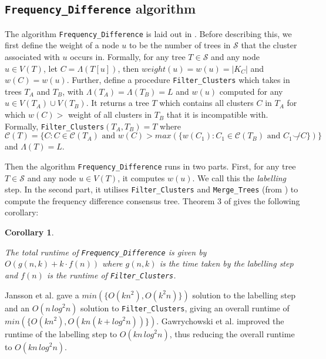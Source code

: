 \documentclass{article}
\newcommand{\compatible}{\smile}
\newcommand{\leafset}{\Lambda}
\newtheorem{freqdiffruntimecomponents}[incompatibility]{Corollary}
\begin{document}
    \subsection{\texttt{Frequency\_Difference} algorithm}
    The algorithm \texttt{Frequency\_Difference} is laid out in \cite{jansson2018algorithms}. Before describing this, we first define the weight of a node $u$ to be the number of trees in $\mathcal{S}$ that the cluster associated with $u$ occurs in. Formally, for any tree $T \in \mathcal{S}$ and any node $u \in V(T)$, let $C = \leafset(T[u])$, then $weight(u) = w(u) = |K_C|$ and $w(C) = w(u)$. Further, define a procedure \texttt{Filter\_Clusters} which takes in trees $T_A$ and $T_B$, with $\leafset(T_A) = \leafset(T_B) = L$ and $w(u)$ computed for any $u \in V(T_A) \cup V(T_B)$. It returns a tree $T$ which contains all clusters $C$ in $T_A$ for which $w(C) > $ weight of all clusters in $T_B$ that it is incompatible with. Formally, \texttt{Filter\_Clusters}$(T_A, T_B) = T$ where $\mathcal{C}(T) = \{C : C \in \mathcal{C}(T_A) \text{ and } w(C) > max(\{w(C_1) : C_1 \in \mathcal{C}(T_B) \text{ and } C_1 \not\compatible C\})\}$ and $\leafset(T) = L$.

    Then the algorithm \texttt{Frequency\_Difference} runs in two parts. First, for any tree $T \in \mathcal{S}$ and any node $u \in V(T)$, it computes $w(u)$. We call this the \textit{labelling} step. In the second part, it utilises \texttt{Filter\_Clusters} and \texttt{Merge\_Trees} (from \cite{jansson2016improved}) to compute the frequency difference consensus tree. Theorem 3 of \cite{jansson2018algorithms} gives the following corollary:

    \begin{freqdiffruntimecomponents}
        \label{cor:freqdiffruntimecomponents}

        The total runtime of \texttt{Frequency\_Difference} is given by $O(g(n, k) + k \cdot f(n))$ where $g(n, k)$ is the time taken by the labelling step and $f(n)$ is the runtime of \texttt{Filter\_Clusters}.
    \end{freqdiffruntimecomponents}

    Jansson et al. \cite{jansson2018algorithms} gave a $min(\{O(kn^2), O(k^2n)\})$ solution to the labelling step and an $O(n\,log^2n)$ solution to \texttt{Filter\_Clusters}, giving an overall runtime of $min(\{O(kn^2), O(kn(k + log^2n))\})$. Gawrychowski et al. \cite{gawrychowski2017faster} improved the runtime of the labelling step to $O(kn\,log^2n)$, thus reducing the overall runtime to $O(kn\,log^2n)$.
\end{document}
